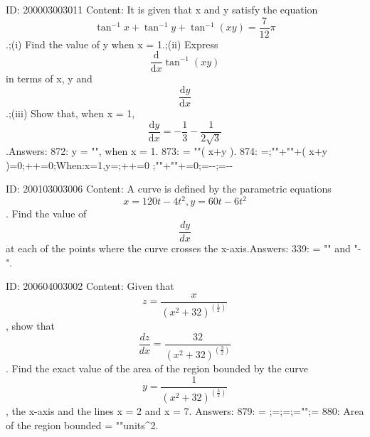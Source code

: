 \documentclass{article}
\begin{document}
ID: 200003003011
Content:
It is given that x and y satisfy the equation \[\tan^{-1} x + \tan^{-1} y + \tan^{-1} (xy) = \frac{7}{12}\pi\].;(i) Find the value of y when x = 1.;(ii) Express \[\frac{\mathrm{d}}{\mathrm{d} x} \tan^{-1} (xy)\] in terms of x, y and \[\frac{\mathrm{d} y}{\mathrm{d} x}\].;(iii) Show that, when x = 1, \[\frac{\mathrm{d} y}{\mathrm{d} x} = -\frac{1}{3} - \frac{1}{2\sqrt{3}}\].Answers:
872: y = "", when x = 1.
873:  = ""\left( x+y \right).
874: =;""+""+\left( x+y \right)=0;++=0;When:x=1,y=;\Rightarrow {}++=0 ;""+""+=0;=--;\therefore {}=--

ID: 200103003006
Content:
A curve is defined by the parametric equations \[x = 120t - 4t^2, y = 60t - 6t^2\]. Find the value of  \[\frac{dy}{dx}\] at each of the points where the curve crosses the x-axis.Answers:
339:  = "" and "-".

ID: 200604003002
Content:
Given that  $$z = \frac{x}{(x^2 + 32) ^\left(\frac{1}{2}\right)}$$, show that  $$\frac{dz}{dx} = \frac{32}{( x^2  + 32 )^\left(\frac{3}{2}\right)}$$. Find the exact value of the area of the region bounded by the curve  $$y = \frac{1}{( x^2  + 32 )^\left(\frac{3}{2}\right)}$$, the x-axis and the lines x = 2 and x = 7. Answers:
879:  =  ;=;=;="";=
880: Area of the region bounded = ""units^2.
\end{document}
